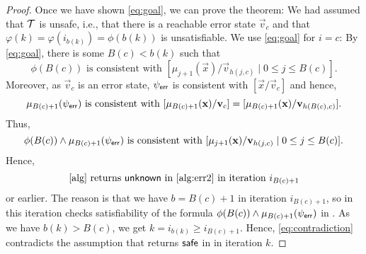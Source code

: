 {\begin{proof}
    Once we have shown \eqref{eq:goal}, we can prove the theorem:
    We had assumed that $\mathcal{T}$ is unsafe, i.e., that there is a reachable error state $\vec{v}_c$ and that $\varphi(k) = \varphi(i_{b(k)}) = \phi(b(k))$ is unsatisfiable.
    We use \eqref{eq:goal} for $i = c$:
    By \eqref{eq:goal}, there is some $B(c) < b(k)$ such that
    \[
      \phi(B(c)) \text{ is consistent with } [\mu_{j+1}(\vec{x})/\vec{v}_{h(j,c)} \mid 0 \leq j \leq B(c)].
    \]
    Moreover, as $\vec{v}_c$ is an error state, $\psi_{\mathsf{err}}$ is consistent with $[\vec{x}/\vec{v}_{c}]$ and hence,
    \[
      \mu_{B(c)+1}(\psi_{\mathsf{err}}) \text{ is consistent with } [\mu_{B(c)+1}(\bm{\mathrm{x}})/\bm{\mathrm{v}}_{c}] = [\mu_{B(c)+1}(\bm{\mathrm{x}})/\bm{\mathrm{v}}_{h(B(c),c)}].
    \]
    Thus,
    \[
      \phi(B(c)) \land \mu_{B(c)+1}(\psi_\err) \text{ is consistent with } [\mu_{j+1}(\vec{x})/\vec{v}_{h(j,c)} \mid 0 \leq j \leq B(c)].
    \]
    Hence,
    \begin{equation}
      \label{eq:contradiction}
      \text{\Cref{alg} returns $\unknown$ in \Cref{alg:err2} in iteration $i_{B(c)+1}$}
    \end{equation}
    or earlier.
    The reason is that we have $b = B(c)+1$ in iteration $i_{B(c)+1}$, so in this iteration  checks satisfiability of the formula $\phi(B(c)) \land \mu_{B(c)+1}(\psi_\err)$ in .
    As we have $b(k) > B(c)$, we get $k = i_{b(k)} \geq i_{B(c)+1}$.
    Hence, \eqref{eq:contradiction} contradicts the assumption that  returns $\mathsf{safe}$ in  in iteration $k$. 


\end{proof}}
